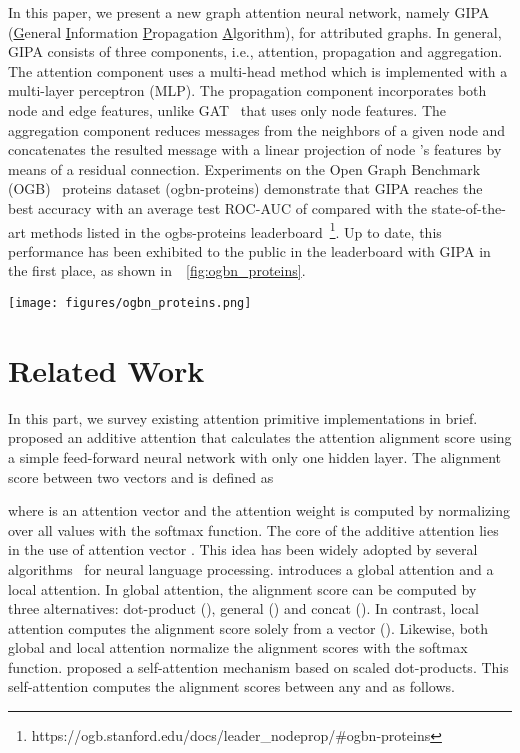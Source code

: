 \documentclass[sigconf]{acmart}
\newcommand{\model}{GIPA\xspace}
\begin{document}
In this paper, we present a new graph attention neural network, namely GIPA (\underline{G}eneral \underline{I}nformation \underline{P}ropagation \underline{A}lgorithm), for attributed graphs.
In general, GIPA consists of three components, i.e.,  attention, propagation and aggregation.
The attention component uses a multi-head method which  is implemented with a multi-layer perceptron (MLP). 
The propagation component incorporates both node and edge features, unlike GAT~\cite{velivckovic2017graph} that uses only node features.
The aggregation component reduces messages from the neighbors of a given node  and concatenates the resulted message with a linear projection of node 's features by means of a residual connection.
Experiments on the Open Graph Benchmark (OGB)~\cite{hu2020open} proteins dataset (ogbn-proteins)  demonstrate that GIPA reaches the best accuracy with an average test ROC-AUC of  compared with the  state-of-the-art methods listed in the ogbs-proteins leaderboard~\footnote{https://ogb.stanford.edu/docs/leader\_nodeprop/\#ogbn-proteins}.
Up to date, this performance has been exhibited to the public in the leaderboard with \model in the first place, as shown in~\figurename~\ref{fig:ogbn_proteins}.
\begin{figure*}[!h]
    \centering
    \texttt{[image: figures/ogbn\_proteins.png]}
    \caption{A snapshot of the leaderboard of ogbn-proteins with \model as the champion.}
    \label{fig:ogbn_proteins}
\end{figure*} 
\section{Related Work}
\label{sec:related}
In this part, we survey existing attention primitive implementations in brief.
\cite{bahdanau2014neural} proposed an additive attention that calculates the attention alignment score using a simple feed-forward neural network with only one hidden layer.
The alignment score  between two vectors  and  is defined as

where  is an attention vector and the attention weight  is computed by normalizing  over all  values with the softmax function.
The core of the additive attention lies in the use of attention vector .
This idea has been widely adopted by several algorithms~\cite{yang2016hierarchical, pavlopoulos2017deeper} for neural language processing.
\cite{luong2015effective} introduces a global attention and a local attention.
In global attention, the alignment score can be computed by three alternatives: dot-product (), general () and concat ().
In contrast, local attention computes the alignment score solely from a vector ().
Likewise, both global and local attention normalize the alignment scores with the softmax function.
\cite{vaswani2017attention} proposed a self-attention mechanism based on scaled dot-products.
This self-attention computes the alignment scores between any  and  as follows.
\end{document}
